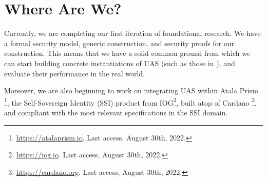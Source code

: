 \section{Where Are We?}
\label{sec:status}

Currently, we are completing our first iteration of foundational research. We
have a formal security model, generic construction, and security proofs for our
construction. This means that we have a solid common ground from which we can
start building concrete instantiations of UAS (such as those in
), and evaluate their performance in the real world.

Moreover, we are also beginning to work on integrating UAS within Atala Prism%
\footnote{\url{https://atalaprism.io}. Last access, August 30th, 2022.}, the
Self-Sovereign Identity (SSI) product from IOG\footnote{\url{https://iog.io}.
  Last access, August 30th, 2022.}, built atop of Cardano%
\footnote{\url{https://cardano.org}. Last access, August 30th, 2022.}, and
compliant with the most relevant specifications in the SSI domain.

